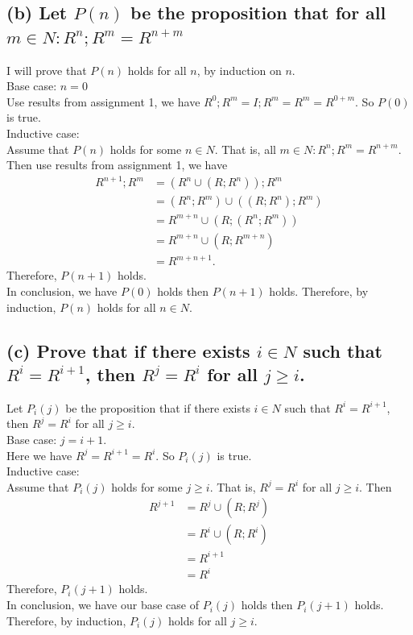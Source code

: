 \documentclass[]{article}
\begin{document}
\begin{spacing}{1.5}
		\subsection*{(b) Let $ P(n) $ be the proposition that for all $ m \in N: R^n; R^m = R^{n+m} $}		
		I will prove that $ P(n) $ holds for all $ n $, by induction on $ n $.\\
		Base case: $ n = 0 $\\
		Use results from assignment 1, we have $ R^0; R^m = I; R^m = R^m =  R^{0+m}$. So $ P(0) $ is true.\\
		Inductive case: \\
		Assume that $ P(n) $ holds for some $ n \in N $. That is,  all $ m \in N: R^n; R^m = R^{n+m} $. Then use results from assignment 1, we have 
		\[\begin{array}{rl}
			R^{n+1}; R^m &= (R^n \cup (R; R^n)); R^m \\
			&= (R^n; R^m) \cup ((R; R^n); R^m) \\
			&= R^{m+n} \cup (R; (R^n; R^m))\\
			&= R^{m+n} \cup (R; R^{m+n})\\
			&= R^{m+n+1}.
		\end{array}\]
		Therefore, $ P(n+1) $ holds.\\
		In conclusion, we have $ P(0) $ holds then $ P(n+1) $ holds. Therefore, by induction, $ P(n) $ holds for all $ n \in N $.

		\subsection*{(c) Prove that if there exists $ i \in N $ such that $ R^i = R^{i+1}  $, then $ R^j = R^i $ for all $ j \geq i $.}
		Let $ P_i(j) $ be the proposition that if there exists $ i \in N $ such that $ R^i = R^{i+1}  $, then $ R^j = R^i $ for all $ j \geq i $.\\
		Base case: $ j = i+1$. \\
		Here we have $ R^j = R^{i+1} = R^i $. So $ P_i(j) $ is true.\\
		Inductive case: \\
		Assume that $ P_i(j) $ holds for some $ j \geq i$. That is, $ R^j = R^i $ for all $ j \geq i $. Then 
		\[\begin{array}{rl}
			R^{j+1} &= R^j \cup (R; R^j) \\
			&= R^i \cup (R; R^i) \\
			&= R^{i+1}\\
			&= R^{i}
		\end{array}\]
		Therefore, $ P_i(j+1) $ holds.\\
		In conclusion, we have our base case of $ P_i(j) $ holds then $ P_i(j+1) $ holds. Therefore, by induction, $ P_i(j) $ holds for all $ j \geq i $.
		

\end{spacing}
\end{document}
